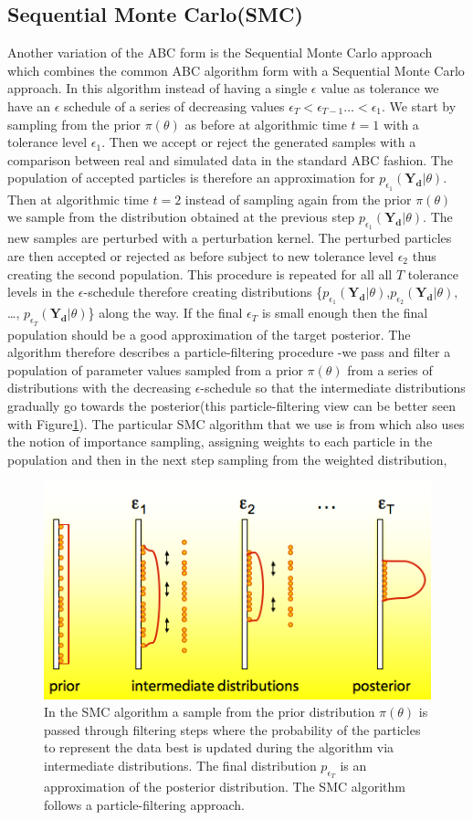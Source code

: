 \documentclass[12pt,a4paper,titlepage]{article}
\begin{document}
\subsection{Sequential Monte Carlo(SMC)}
Another variation of the ABC form is the Sequential Monte Carlo approach\cite{toni2009abc} which combines the common ABC algorithm form with a Sequential Monte Carlo approach.  In this algorithm instead of having a single $\epsilon$ value as tolerance we have an $\epsilon$ schedule of a series of decreasing values $\epsilon_T < \epsilon_{T-1} \dots < \epsilon_{1}$. We start by sampling from the prior $\pi(\theta)$ as before at algorithmic time $t=1$ with a tolerance level $\epsilon_{1}$. Then we accept or reject the generated samples with a comparison between real and simulated data in the standard ABC fashion. The population of accepted particles is therefore an approximation for $p_{\epsilon_{1}}(\mathbf{Y_{d}}|\theta)$. Then at algorithmic time $t=2$ instead of sampling again from the prior $\pi(\theta)$ we sample from the distribution obtained at the previous step $p_{\epsilon_{1}}(\mathbf{Y_{d}}|\theta)$. The new samples are perturbed with a perturbation kernel. The perturbed particles are then accepted or rejected as before subject to new tolerance level $\epsilon_{2}$ thus creating the second population. This procedure is repeated for all all $T$ tolerance levels in the $\epsilon$-schedule therefore creating distributions \{$p_{\epsilon_{1}}(\mathbf{Y_{d}}|\theta)$,$p_{\epsilon_{2}}(\mathbf{Y_{d}}|\theta), $\dots, $p_{\epsilon_{T}}(\mathbf{Y_{d}}|\theta)$\} along the way. If the final $\epsilon_{T}$ is small enough then the final population should be a good approximation of the target posterior.  The algorithm therefore describes a particle-filtering procedure -we pass and filter a population of parameter values sampled from a prior $\pi(\theta)$  from a series of distributions with the decreasing $\epsilon$-schedule so that the intermediate distributions gradually go towards the posterior(this particle-filtering view can be better seen with Figure\ref{fig:smc}). The particular SMC algorithm that we use is from \cite{toni2009abc} which also uses the notion of importance sampling, assigning weights to each particle in the population and then in the next step sampling from the weighted distribution,
\begin{figure}
\centering
\includegraphics[width=0.5\linewidth]{ABCSMC}
\caption{In the SMC algorithm a sample from the prior distribution $\pi(\theta)$ is passed through filtering steps where the probability of the particles to represent the data best is updated during the algorithm via intermediate distributions. The final distribution $p_{\epsilon_{T}}$ is an approximation of the posterior distribution. The SMC  algorithm follows a particle-filtering approach.}
\label{fig:smc}
\end{figure}
\end{document}
